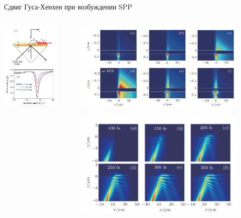 \documentclass[9pt, compress, xcolor=table]{beamer}
\begin{document}
\begin{frame}{Сдвиг Гуса-Хенхен при возбуждении SPP}
\begin{columns}[c]
\column{6.3cm}
\begin{center}
\includegraphics[width=0.8\textwidth]{gh15}
\end{center}
\column{6.3cm}
\begin{center}
\includegraphics[width=0.9\textwidth]{gh8}

\includegraphics[width=0.9\textwidth]{gh10}
\end{center}


\end{columns}
\end{frame}
\end{document}
